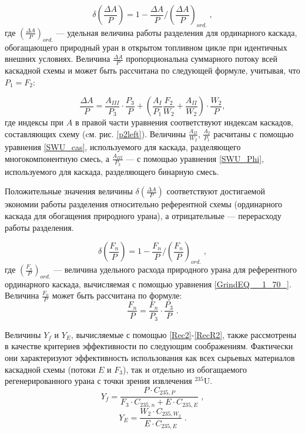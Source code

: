 \begin{equation} \label{DeltaA} 
    \delta(\frac{\Delta A}{P})=1-\frac{\Delta A}{P}/(\frac{\Delta A}{P})_{ord.} \; ,
\end{equation}
где $(\frac{\Delta A}{P})_{ord.}$ --- удельная величина работы разделения для ординарного каскада, обогащающего природный уран в открытом топливном цикле при идентичных внешних условиях. Величина $\frac{\Delta A}{P}$ пропорциональна суммарного потоку всей каскадной схемы и может быть рассчитана по следующей формуле, учитывая, что ${P_1}={F_2}$:

\begin{equation} \label{DeltaAP}
  \frac{\Delta A}{P} = \frac{A_{III}}{P_3} \cdot \frac{P_3}{P}+\left(\frac{A_I}{P_1} \frac{F_2}{W_2}+\frac{A_{II}}{W_2}\right) \cdot \frac{W_2}{P},
\end{equation}
где индексы при $A$ в правой части уравнения соответствуют индексам каскадов, составляющих схему (cм. рис. \ref{p2left}). Величины $\frac{A_{II}}{W_2}$, $\frac{A_I}{P_1}$ расчитаны с помощью уравнения \ref{SWU_cas}, используемого для каскада, разделяющего многокомпонентную смесь, а $\frac{A_{III}}{P_3}$ --- с помощью уравнения \ref{SWU_Phi}, используемого для каскада, разделяющего бинарную смесь.

Положительные значения величины $\delta(\frac{\Delta A}{P})$ соответствуют достигаемой экономии работы разделения относительно референтной схемы (ординарного каскада для обогащения природного урана), а отрицательные --- перерасходу работы разделения.

\begin{equation} \label{DeltaFnu} 
    \delta(\frac{F_n}{P})=1-\frac{F_n}{P}/(\frac{F_n}{P})_{ord.} \; ,
\end{equation} 
где $(\frac{F_n}{P})_{ord.}$ --- величина удельного расхода природного урана для референтного ординарного каскада, вычисляемая с помощью уравнения \ref{GrindEQ__1_70_}. Величина $\frac{F_n}{P}$ может быть рассчитана по формуле:
\begin{equation} \label{Delta_Fnu}
    \frac{F_n}{P} = \frac{F_n}{P_3} \cdot \frac{P_3}{P} \; .
\end{equation}

Величины $Y_f$ и $Y_{E}$, вычисляемые с помощью \ref{Rec2}-\ref{RecR2}, также рассмотрены в качестве критериев эффективности по следующим соображениям. Фактически они характеризуют эффективность использования как всех сырьевых материалов каскадной схемы (потоки $E$ и $F_3$), так и отдельно из обогащаемого регенерированного урана с точки зрения извлечения $^{235}$U.
\begin{equation} \label{Rec2} 
    Y_f = \frac{P \cdot C_{235,P}}{F_3 \cdot C_{235,n} + E \cdot C_{235,E}} \; , 
\end{equation} 
\begin{equation} \label{RecR2} 
    Y_{E} = \frac{W_2\cdot C_{235,W_2}}{E \cdot C_{235,E}}  \; .    
\end{equation} 


